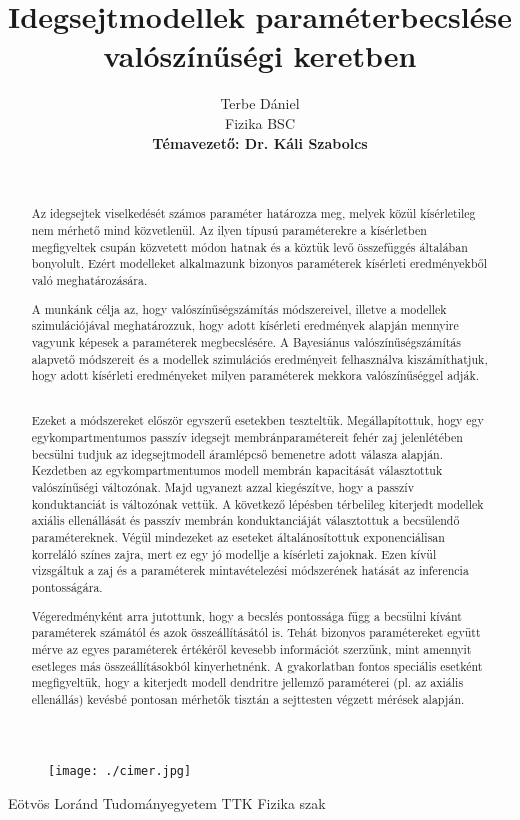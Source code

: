 \documentclass[hidelinks, 12pt]{article}
\author{Terbe Dániel \\
Fizika BSC \\
\textbf{Témavezető: Dr. Káli Szabolcs}
}
\title{\textbf{Idegsejtmodellek paraméterbecslése valószínűségi keretben}}
\numberwithin{equation}{subsection}
\numberwithin{figure}{subsection}
\numberwithin{table}{subsection}
\begin{document}
\maketitle

\begin{figure}[!htb]
	\centering
	\texttt{[image: ./cimer.jpg]}
\end{figure}

\begin{center}
	Eötvös Loránd Tudományegyetem TTK Fizika szak
\end{center}

\newpage
\tableofcontents
\newpage
\listoffigures
\newpage

\renewcommand{\abstractname}{Absztrakt}
\begin{abstract}
\

Az idegsejtek viselkedését számos paraméter határozza meg, melyek közül kísérletileg nem mérhető mind közvetlenül. Az ilyen típusú paraméterekre a kísérletben megfigyeltek csupán közvetett módon hatnak és a köztük levő összefüggés általában bonyolult. Ezért modelleket alkalmazunk bizonyos paraméterek kísérleti eredményekből való meghatározására.\


A munkánk célja az, hogy valószínűségszámítás módszereivel, illetve a modellek szimulációjával meghatározzuk, hogy adott kísérleti eredmények alapján mennyire vagyunk képesek a paraméterek megbecslésére. A Bayesiánus valószínűségszámítás alapvető módszereit és a modellek szimulációs eredményeit felhasználva kiszámíthatjuk, hogy adott kísérleti eredményeket milyen paraméterek mekkora valószínűséggel adják.
\

Ezeket a módszereket először egyszerű esetekben teszteltük. Megállapítottuk, hogy egy egykompartmentumos passzív idegsejt membránparamétereit fehér zaj jelenlétében becsülni tudjuk az idegsejtmodell áramlépcső bemenetre adott válasza alapján. Kezdetben az egykompartmentumos modell membrán kapacitását választottuk valószínűségi változónak. Majd ugyanezt azzal kiegészítve, hogy a passzív konduktanciát is változónak vettük. A következő lépésben térbelileg kiterjedt modellek axiális ellenállását és passzív membrán konduktanciáját választottuk a becsülendő paramétereknek. Végül mindezeket az eseteket általánosítottuk exponenciálisan korreláló színes zajra, mert ez egy jó modellje a kísérleti zajoknak. Ezen kívül vizsgáltuk a zaj és a paraméterek mintavételezési módszerének hatását az inferencia pontosságára.\

Végeredményként arra jutottunk, hogy a becslés pontossága függ a becsülni kívánt paraméterek számától és azok összeállításától is. Tehát bizonyos paramétereket együtt mérve az egyes paraméterek értékéről kevesebb információt szerzünk, mint amennyit esetleges más összeállításokból kinyerhetnénk. A gyakorlatban fontos speciális esetként megfigyeltük, hogy a kiterjedt modell dendritre jellemző paraméterei (pl. az axiális ellenállás) kevésbé pontosan mérhetők tisztán a sejttesten végzett mérések alapján.\


\end{abstract}
\end{document}
